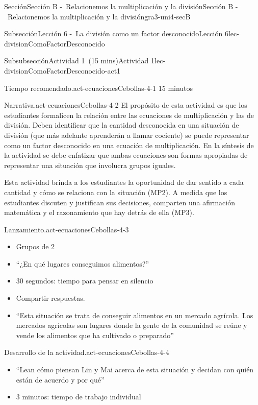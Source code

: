 \documentclass[oneside,10pt,]{article}
\begin{document}
\begin{sectionptx}{Sección}{Sección B -~Relacionemos la multiplicación y la división}{}{Sección B -~Relacionemos la multiplicación y la división}{}{}{gra3-uni4-secB}
\begin{subsectionptx}{Subsección}{Lección 6 -~La división como un factor desconocido}{}{Lección 6}{}{}{lec-divisionComoFactorDesconocido}
%
\begin{subsubsectionptx}{Subsubsección}{Actividad 1~(15 mins)}{}{Actividad 1}{}{}{lec-divisionComoFactorDesconocido-act1}
\par
\begin{paragraphs}{Tiempo recomendado.}{act-ecuacionesCebollas-4-1}%
15 minutos%
\end{paragraphs}%
\begin{paragraphs}{Narrativa.}{act-ecuacionesCebollas-4-2}%
El propósito de esta actividad es que los estudiantes formalicen la relación entre las ecuaciones de multiplicación y las de división. Deben identificar que la cantidad desconocida en una situación de división (que más adelante aprenderán a llamar cociente) se puede representar como un factor desconocido en una ecuación de multiplicación. En la síntesis de la actividad se debe enfatizar que ambas ecuaciones son formas apropiadas de representar una situación que involucra grupos iguales.%
\par
Esta actividad brinda a los estudiantes la oportunidad de dar sentido a cada cantidad y cómo se relaciona con la situación (MP2). A medida que los estudiantes discuten y justifican sus decisiones, comparten una afirmación matemática y el razonamiento que hay detrás de ella (MP3).%
\end{paragraphs}%
\begin{paragraphs}{Lanzamiento.}{act-ecuacionesCebollas-4-3}%
%
\begin{itemize}[label=\textbullet]
\item{}Grupos de 2%
\item{}``¿En qué lugares conseguimos alimentos?''%
\item{}30 segundos: tiempo para pensar en silencio%
\item{}Compartir respuestas.%
\item{}``Esta situación se trata de conseguir alimentos en un mercado agrícola. Los mercados agrícolas son lugares donde la gente de la comunidad se reúne y vende los alimentos que ha cultivado o preparado''%
\end{itemize}
\end{paragraphs}%
\begin{paragraphs}{Desarrollo de la actividad.}{act-ecuacionesCebollas-4-4}%
%
\begin{itemize}[label=\textbullet]
\item{}``Lean cómo piensan Lin y Mai acerca de esta situación y decidan con quién están de acuerdo y por qué''%
\item{}3 minutos: tiempo de trabajo individual%

\end{itemize}
\end{paragraphs}
\end{subsubsectionptx}
\end{subsectionptx}
\end{sectionptx}
\end{document}
